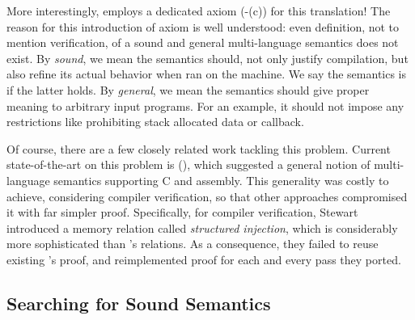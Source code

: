 {More interestingly, \cc{} employs a dedicated axiom (-(c)) for this translation!
The reason for this introduction of axiom is well understood: even definition, not to mention verification, of a sound and general multi-language semantics does not exist.
By \textit{sound}, we mean the semantics %
should, not only justify compilation, but also refine its actual behavior when ran on the machine.
We say the semantics is \lbound{} if the latter holds.
By \textit{general}, we mean the semantics should give proper meaning to arbitrary input programs.
For an example, it should not impose any restrictions like prohibiting stack allocated data or callback.


Of course, there are a few closely related work tackling this problem.
Current state-of-the-art on this problem is \ccc{}(\cccfull\cite{stewart:ccc}), which suggested a general notion of multi-language semantics supporting C and assembly.
This generality was costly to achieve, considering compiler verification, so that other approaches \cite{gu:dscal, wang:saccx} compromised it with far simpler proof.
Specifically, for compiler verification, Stewart \etal{} introduced a memory relation called \textit{structured injection}, which is considerably more sophisticated than \cc{}'s relations.
As a consequence, they failed to reuse existing \cc{}'s proof, and reimplemented proof for each and every pass they ported.





\subsection{Searching for Sound Semantics}\label{sec:introduction:semantics}

}
